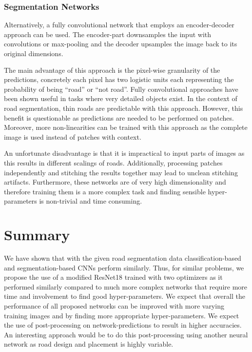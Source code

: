 \documentclass[10pt,conference,compsocconf]{IEEEtran}
\begin{document}
\subsubsection{Segmentation Networks}
Alternatively, a fully convolutional network that employs an encoder-decoder approach can be used. The encoder-part downsamples the input with convolutions or max-pooling and the decoder upsamples the image back to its original dimensions.

The main advantage of this approach is the pixel-wise granularity of the predictions, concretely each pixel has two logistic units each representing the probability of being ``road'' or ``not road''. Fully convolutional approaches have been shown useful in tasks where very detailed objects exist. In the context of road segmentation, thin roads are predictable with this approach. However, this benefit is questionable as predictions are needed to be performed on patches. Moreover, more non-linearities can be trained with this approach as the complete image is used instead of patches with context.

An unfortunate disadvantage is that it is impractical to input parts of images as this results in different scalings of roads. Additionally, processing patches independently and stitching the results together may lead to unclean stitching artifacts. Furthermore, these networks are of very high dimensionality and therefore training them is a more complex task and finding sensible hyper-parameters is non-trivial and time consuming.

\section{Summary}
\label{sec:summary}
We have shown that with the given road segmentation data classification-based and segmentation-based CNNs perform similarly. Thus, for similar problems, we propose the use of a modified ResNet18 trained with two optimizers as it performed similarly compared to much more complex networks that require more time and involvement to find good hyper-parameters. We expect that overall the performance of all proposed networks can be improved with more varying training images and by finding more appropriate hyper-parameters. We expect the use of post-processing on network-predictions to result in higher accuracies. An interesting approach would be to do this post-processing using another neural network as road design and placement is highly variable.

\clearpage




%
\end{document}
